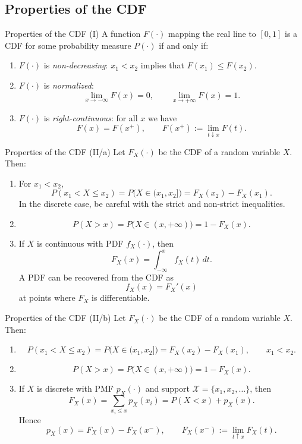 \documentclass[a4paper,12pt,oneside]{report}
\begin{document}
\subsection{Properties of the CDF}

\begin{framedprop}{Properties of the CDF (I)}\label{prop:cdf-properties-i}
A function $F(\cdot)$ mapping the real line to $[0,1]$ is a CDF
for some probability measure $P(\cdot)$ if and only if:
\begin{enumerate}
  \item $F(\cdot)$ is \emph{non-decreasing}: $x_1<x_2$ implies that
    $F(x_1)\leq F(x_2)$.
  \item $F(\cdot)$ is \emph{normalized}:
    \[
      \lim_{x\to-\infty}F(x)=0,
      \qquad
      \lim_{x\to+\infty}F(x)=1.
    \]
  \item $F(\cdot)$ is \emph{right-continuous}: for all $x$ we have
    \[
      F(x)=F(x^+),
      \qquad F(x^+):=\lim_{t\downarrow x}F(t).
    \]
\end{enumerate}
\end{framedprop}

\begin{framedprop}{Properties of the CDF (II/a)}
Let $F_X(\cdot)$ be the CDF of a random variable $X$. Then:
\begin{enumerate}
  \item For $x_1<x_2$,
    \[
      P(x_1<X\leq x_2)=P\bigl(X\in(x_1,x_2]\bigr)
        =F_X(x_2)-F_X(x_1).
    \]
    In the discrete case, be careful with the strict and non-strict
    inequalities.
  \item
    \[
      P(X>x)=P\bigl(X\in(x,+\infty)\bigr)=1-F_X(x).
    \]
  \item If $X$ is continuous with PDF $f_X(\cdot)$, then
    \[
      F_X(x)=\int_{-\infty}^{x}f_X(t)\,dt.
    \]
    A PDF can be recovered from the CDF as
    \[
      f_X(x)=F_X'(x)
    \]
    at points where $F_X$ is differentiable.
\end{enumerate}
\end{framedprop}

\begin{framedprop}{Properties of the CDF (II/b)}
Let $F_X(\cdot)$ be the CDF of a random variable $X$. Then:
\begin{enumerate}
  \item
    \[
      P(x_1<X\leq x_2)=P\bigl(X\in(x_1,x_2]\bigr)
        =F_X(x_2)-F_X(x_1),\qquad x_1<x_2.
    \]
  \item
    \[
      P(X>x)=P\bigl(X\in(x,+\infty)\bigr)=1-F_X(x).
    \]
  \item If $X$ is discrete with PMF $p_X(\cdot)$ and support
    $\mathcal X=\{x_1,x_2,\ldots\}$, then
    \[
      F_X(x)=\sum_{x_i\leq x}p_X(x_i)=P(X<x)+p_X(x).
    \]
    Hence
    \[
      p_X(x)=F_X(x)-F_X(x^-),
      \qquad F_X(x^-):=\lim_{t\uparrow x}F_X(t).
    \]
\end{enumerate}
\end{framedprop}
\end{document}
